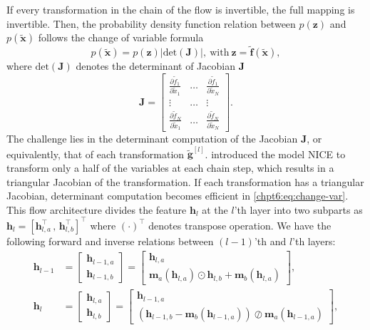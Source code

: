 If every transformation in the chain of the flow is invertible, the full mapping is invertible.
Then, the probability density function relation between $p(\bm{z})$ and $p(\tilde{\bm{x}})$ follows the change of variable formula
\begin{equation}\label{chpt6:eq:change-var}
  p(\tilde{\bm{x}}) =  p(\bm{z}) \big| \mathrm{det}(\bm{J}) \big|, ~\mathrm{with}~ {\bm{z}=\tilde{\bm{f}}(\tilde{\bm{x}})},
\end{equation}
where $\mathrm{det}(\bm{J})$ denotes the determinant of Jacobian $\bm{J}$
\begin{equation}
  \bm{J} = \left[
    \begin{array}{ccc}
      \frac{\partial \tilde{f}_1}{\partial \tilde{x}_1} & \hdots & \frac{\partial \tilde{f}_1}{\partial \tilde{x}_N} \\
      \vdots & \hdots & \vdots \\
      \frac{\partial \tilde{f}_N}{\partial \tilde{x}_1} & \hdots & \frac{\partial \tilde{f}_N}{\partial \tilde{x}_N}
    \end{array}
  \right].
\end{equation}
The challenge lies in the determinant computation of the Jacobian $\bm{J}$, or equivalently, that of each transformation $\tilde{\bm{g}}^{[l]}$. \cite{DBLP:journals/corr/DinhKB14} introduced the model NICE to transform only a half of the variables at each chain step, which results in a triangular Jacobian of the transformation. If each transformation has a triangular Jacobian, determinant computation becomes efficient in \eqref{chpt6:eq:change-var}.
This flow architecture divides the feature $\bm{h}_l$ at the $l$'th layer into two subparts as
$\bm{h}_l = [\bm{h}_{l,a}^{\intercal} \, , \, \bm{h}_{l,b}^{\intercal}]^{\intercal}$ where
$(\cdot)^{\intercal}$ denotes transpose operation. We have the following forward and inverse relations between $(l-1)$'th and $l$'th layers:
\begin{align}\label{chpt6:eq-gl-coupling}
  \bm{h}_{l-1} &=
                 \begin{bmatrix}
                   \bm{h}_{l-1,a}\\
                   \bm{h}_{l-1,b}
                 \end{bmatrix}
  =
  \begin{bmatrix}
    \bm{h}_{l,a}\\
    \bm{m}_a(\bm{h}_{l,a})\odot \bm{h}_{l,b} + \bm{m}_b(\bm{h}_{l,a})
  \end{bmatrix},\nonumber\\
  \bm{h}_{l} &=
               \begin{bmatrix}
                 \bm{h}_{l,a}\\
                 \bm{h}_{l,b}
               \end{bmatrix}
  =
  \begin{bmatrix}
    \bm{h}_{l-1,a}\\
    \left(  \bm{h}_{l-1,b} - \bm{m}_b(\bm{h}_{l-1,a}) \right)\oslash \bm{m}_a(\bm{h}_{l-1,a}) 
  \end{bmatrix}, 
\end{align}
